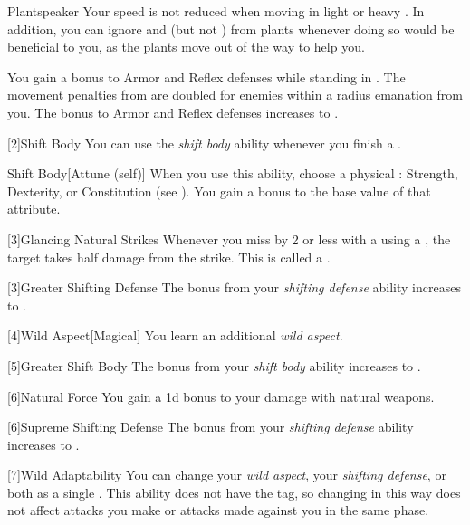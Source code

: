 {            \begin{freeability}{Plantspeaker}
                Your speed is not reduced when moving in light or heavy .
                In addition, you can ignore  and  (but not ) from plants whenever doing so would be beneficial to you, as the plants move out of the way to help you.

                \rankline
                 You gain a  bonus to Armor and Reflex defenses while standing in .
                 The movement penalties from  are doubled for enemies within a \areahuge radius emanation from you.
                 The bonus to Armor and Reflex defenses increases to .
            \end{freeability}
        }

        [2]{Shift Body} You can use the \textit{shift body} ability whenever you finish a .
        \begin{freeability}{Shift Body}[Attune (self)]
            When you use this ability, choose a physical : Strength, Dexterity, or Constitution (see ).
            You gain a  bonus to the base value of that attribute.
        \end{freeability}

        [3]{Glancing Natural Strikes} Whenever you miss by 2 or less with a  using a , the target takes half damage from the strike.
        This is called a .

        [3]{Greater Shifting Defense}
        The bonus from your \textit{shifting defense} ability increases to .

        [4]{Wild Aspect}[Magical]
        You learn an additional \textit{wild aspect}.

        [5]{Greater Shift Body} The bonus from your \textit{shift body} ability increases to .

        [6]{Natural Force} You gain a \plus1d bonus to your damage with natural weapons.

        [6]{Supreme Shifting Defense}
        The bonus from your \textit{shifting defense} ability increases to .

        [7]{Wild Adaptability} You can change your \textit{wild aspect}, your \textit{shifting defense}, or both as a single .
        This ability does not have the  tag, so changing in this way does not affect attacks you make or attacks made against you in the same phase.

